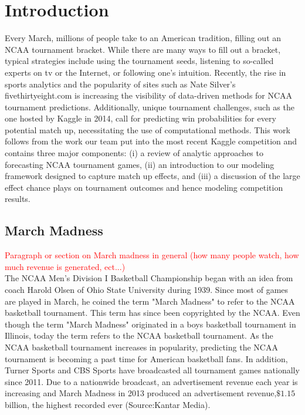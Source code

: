 \section{Introduction}

Every March, millions of people take to an American tradition, filling out an NCAA tournament bracket. While there are many ways to fill out a bracket, typical strategies include using the tournament seeds, listening to so-called experts on tv or the Internet, or following one's intuition. Recently, the rise in sports analytics and the popularity of sites such as Nate Silver's fivethirtyeight.com is increasing the visibility of data-driven methods for NCAA tournament predictions. Additionally, unique tournament challenges, such as the one hosted by Kaggle in 2014, call for predicting win probabilities for every potential match up, necessitating the use of computational methods. This work follows from the work our team put into the most recent Kaggle competition and contains three major components: (i) a review of analytic approaches to forecasting NCAA tournament games, (ii) an introduction to our modeling framework designed to capture match up effects, and (iii) a discussion of the large effect chance plays on tournament outcomes and hence modeling competition results.

\subsection{March Madness}
\textcolor{red}{Paragraph or section on March madness in general (how many people watch, how much revenue is generated, ect...)}\\
The NCAA Men's Division I Basketball Championship began with an idea from coach Harold Olsen of Ohio State University during 1939. Since most of games are played in March, he coined the term "March Madness" to refer to the NCAA basketball tournament. This term has since been copyrighted by the NCAA. Even though the term "March Madness" originated in a boys basketball tournament in Illinois, today the term refers to the NCAA basketball tournament. As the NCAA basketball tournament increases in popularity, predicting the NCAA tournament is becoming a past time for American basketball fans. In addition, Turner Sports and CBS Sports have broadcasted all tournament games nationally since 2011. Due to a nationwide broadcast, an advertisement revenue each year is increasing and March Madness in 2013 produced an advertisement revenue,$\$ 1.15$ billion, the highest recorded ever (Source:Kantar Media).

